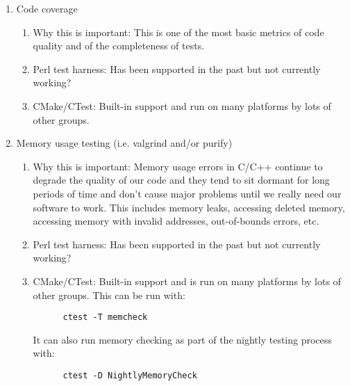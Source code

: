 \documentclass[pdf,ps2pdf,11pt]{SANDreport}
\begin{document}
\begin{enumerate}

{}\item Code coverage

  \begin{enumerate}

  {}\item Why this is important: This is one of the most basic
  metrics of code quality and of the completeness of tests.

  {}\item Perl test harness: Has been supported in the past but not
  currently working?

  {}\item CMake/CTest: Built-in support and run on many platforms by
  lots of other groups.

  \end{enumerate}

{}\item Memory usage testing (i.e. valgrind and/or purify)

  \begin{enumerate}

  {}\item Why this is important: Memory usage errors in C/C++
  continue to degrade the quality of our code and they tend to sit
  dormant for long periods of time and don't cause major problems
  until we really need our software to work.  This includes memory
  leaks, accessing deleted memory, accessing memory with invalid
  addresses, out-of-bounds errors, etc.

  {}\item Perl test harness: Has been supported in the past but not
  currently working?

  {}\item CMake/CTest: Built-in support and is run on many platforms
  by lots of other groups.  This can be run with:

    \begin{verbatim}
      ctest -T memcheck
    \end{verbatim}

  It can also run memory checking as part of the nightly testing
  process with:

    \begin{verbatim}
      ctest -D NightlyMemoryCheck
    \end{verbatim}

  \end{enumerate}


\end{enumerate}
\end{document}
